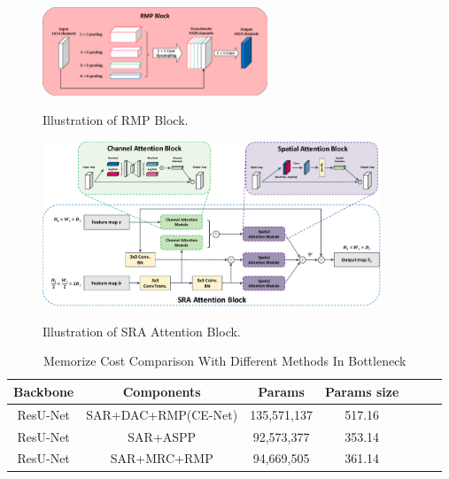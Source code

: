 \documentclass[UTF8]{article} %
\begin{document}
\begin{figure}[ht]
  \begin{center}
  \includegraphics[width=0.6\textwidth]{rmp_block.pdf}
  \vspace{-2mm}
  \caption{Illustration of RMP Block.} 
  \vspace{-2mm}
  \label{fig:rmp_block}
  \end{center}
  \vspace{-0.35cm}
\end{figure}

\begin{figure}[ht]
  \begin{center}
  \includegraphics[width=0.9\textwidth]{Attention.pdf}
  \vspace{-2mm}
  \caption{Illustration of SRA Attention Block.} 
  \vspace{-2mm}
  \label{fig:Attention}
  \end{center}
  \vspace{-0.35cm}
\end{figure}

\begin{table}[H]
  \vspace{-2mm}
  \begin{center}\small
  \caption{Memorize Cost Comparison With Different Methods In Bottleneck}
  \label{param-table}
  \begin{tabular}{ccccccc}
    
  \toprule
  Backbone & Components & Params & Params size \\
  \midrule
    ResU-Net & SAR+DAC+RMP(CE-Net) & 135,571,137 & 517.16 \\
    ResU-Net & SAR+ASPP    & 92,573,377 & 353.14  \\
    ResU-Net & SAR+MRC+RMP & 94,669,505 & 361.14  \\
\bottomrule    
  \end{tabular}
  \end{center}
  \vspace{-4mm}
\end{table}
\end{document}
